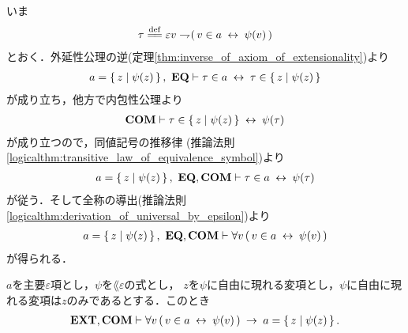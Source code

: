 	\begin{sketch}
		いま
		\begin{align}
			\tau \defeq \varepsilon v \negation (\, v \in a \lrarrow \psi(v)\, )
		\end{align}
		とおく．外延性公理の逆(定理\ref{thm:inverse_of_axiom_of_extensionality})より
		\begin{align}
			a = \left\{\, z \mid \psi(z)\, \right\},\ \mbox{{\bf EQ}} \vdash 
			\tau \in a \hspace{0.25em}\leftrightarrow\hspace{0.25em} \tau \in \left\{\, z \mid \psi(z)\, \right\}
		\end{align}
		が成り立ち，他方で内包性公理より
		\begin{align}
			\mbox{\bf COM} \vdash \tau \in \left\{\, z \mid \psi(z)\, \right\} \hspace{0.25em}\leftrightarrow\hspace{0.25em} \psi(\tau)
		\end{align}
		が成り立つので，同値記号の推移律
		(推論法則\ref{logicalthm:transitive_law_of_equivalence_symbol})より
		\begin{align}
			a = \left\{\, z \mid \psi(z)\, \right\},\ \mbox{{\bf EQ}},\mbox{\bf COM} \vdash \tau \in a \hspace{0.25em}\leftrightarrow\hspace{0.25em} \psi(\tau)
		\end{align}
		が従う．そして全称の導出(推論法則\ref{logicalthm:derivation_of_universal_by_epsilon})より
		\begin{align}
			a = \left\{\, z \mid \psi(z)\, \right\},\ \mbox{{\bf EQ}},\mbox{\bf COM} \vdash 
			\forall v\, (\, v \in a \hspace{0.25em}\leftrightarrow\hspace{0.25em} \psi(v)\, )
		\end{align}
		が得られる．
		\QED
	\end{sketch}
	
	\begin{screen}
		\begin{thm}
		\label{thm:equivalent_formula_rewriting_2}
			$a$を主要$\varepsilon$項とし，$\psi$を$\lang{\varepsilon}$の式とし，
			$z$を$\psi$に自由に現れる変項とし，$\psi$に自由に現れる変項は$z$のみであるとする．このとき
			\begin{align}
				\mbox{{\bf EXT}},\mbox{\bf COM} \vdash \forall v\, (\, v \in a \hspace{0.25em}\leftrightarrow\hspace{0.25em} \psi(v)\, )
				\hspace{0.25em}\rightarrow\hspace{0.25em} a = \left\{\, z \mid \psi(z)\, \right\}.
			\end{align}
		\end{thm}
	\end{screen}
	
